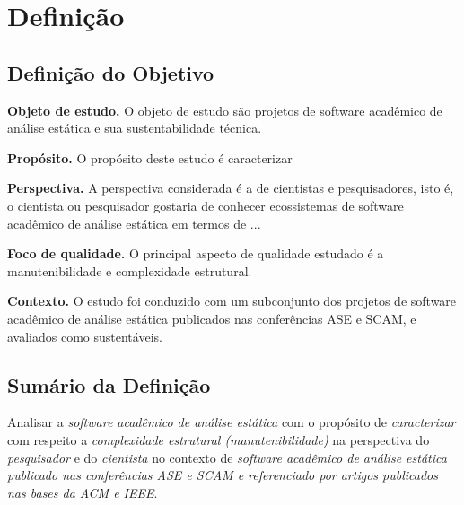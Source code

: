 \section{Definição} \label{sec:study2:definition}


\subsection{Definição do Objetivo}

\begin{description}
\item{\bf Objeto de estudo.}
O objeto de estudo são projetos de software acadêmico de análise estática e sua sustentabilidade técnica.

\item{\bf Propósito.}
O propósito deste estudo é caracterizar 

\item{\bf Perspectiva.}
A perspectiva considerada é a de cientistas e pesquisadores, isto é,
o cientista ou pesquisador gostaria de conhecer ecossistemas de software acadêmico de análise estática
em termos de ...

\item{\bf Foco de qualidade.}
O principal aspecto de qualidade estudado é a manutenibilidade e complexidade estrutural.

\item{\bf Contexto.}
O estudo foi conduzido com um subconjunto dos projetos de software acadêmico de análise estática
publicados nas conferências ASE e SCAM, e avaliados como sustentáveis.
\end{description}

\subsection{Sumário da Definição}


Analisar a \textit{software acadêmico de análise estática} %
com o propósito de \textit{caracterizar}  %
com respeito a \textit{complexidade estrutural (manutenibilidade)}  %
na perspectiva do \textit{pesquisador} e do \textit{cientista}%
no contexto de \textit{software acadêmico de análise estática publicado nas conferências ASE e SCAM
e referenciado por artigos publicados nas bases da ACM e IEEE}. %

